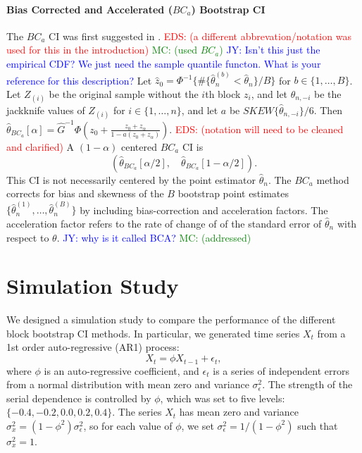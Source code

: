 \documentclass[12pt, letterpaper, titlepage]{article}
\newcommand{\jy}[1]{\textcolor{blue}{JY: #1}}
\newcommand{\eds}[1]{\textcolor{red}{EDS: (#1)}}
\newcommand{\mc}[1]{\textcolor{green}{MC: (#1)}}
\begin{document}
\paragraph{Bias Corrected and Accelerated ($BC_a$) Bootstrap CI}
The $BC_a$ CI was first suggested in \citet{efron1987better}.
\eds{a different abbrevation/notation was used for this in the introduction}
\mc{used $BC_a$}
\jy{Isn't this just the empirical CDF? We just need the sample quantile functon.
  What is your reference for this description?}
Let $\hat{z}_0 = \Phi^{-1}\{\#\{\hat\theta_n^{(b)} < \hat{\theta}_n\} / B\}$
for $b \in \{1, \ldots, B\}$. 
Let $Z_{(i)}$ be the original sample without the $i$th block $z_i$, and let
$\hat{\theta}_{n, -i}$ be the jackknife values of $Z_{(i)}$
for $i \in \{1, \ldots, n\}$, 
and let $a$ be $SKEW\{\hat{\theta}_{n, -i}\} / 6$. Then
$\hat\theta_{BC_a}[\alpha] = \hat{G}^{-1}\Phi(z_0 + \frac{z_{0} +
  z_{\alpha}}{1 - a(z_{0} + z_{\alpha})}).$
\eds{notation will need to be cleaned and clarified}
A $(1 - \alpha)$ centered $BC_a$ CI is
\[
(\hat\theta_{BC_a}[\alpha/2], \quad
\hat\theta_{BC_a}[1 - \alpha/2]).
\]
This CI is not necessarily centered by the point estimator $\hat\theta_n$. The
$BC_a$ method corrects for bias and skewness of the $B$ bootstrap point
estimates $\{\hat\theta_n^{(1)}, \ldots, \hat\theta_n^{(B)}\}$ by including
bias-correction and acceleration factors. The acceleration factor refers to
the 
rate of change of of the standard error of $\hat\theta_n$ with respect to
$\theta$.
\jy{why is it called BCA?}
\mc{addressed}

\section{Simulation Study}
\label{sec:simu}

We designed a simulation study to compare the performance of the different
block
bootstrap CI methods. In particular, we generated time series $X_t$
from a 1st order auto-regressive (AR1) process:
\[
X_t = \phi X_{t-1} + \epsilon_t,
\]
where $\phi$ is an auto-regressive coefficient, and $\epsilon_t$ is a series of
independent errors from a normal distribution with mean zero and variance
$\sigma_{\epsilon}^2$. The strength of the serial dependence is controlled by
$\phi$, which was set to five levels: $\{-0.4, -0.2, 0.0, 0.2, 0.4\}$.
The series $X_t$ has mean zero and variance
$\sigma_x^2 = (1 - \phi^2) \sigma_{\epsilon}^2$, so for each value of $\phi$,
we
set $\sigma_{\epsilon}^2 = 1 / (1 - \phi^2)$ such that $\sigma_x^2 = 1$.
\end{document}
